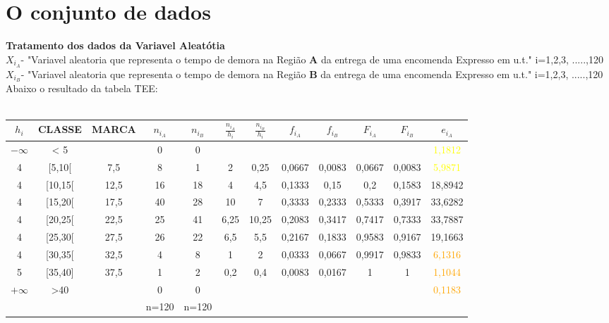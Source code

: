 \section{O conjunto de dados}\label{dados}
\noindent
\textbf{Tratamento dos dados da Variavel Aleatótia} \\
$X_{i_A}$- "Variavel aleatoria que representa o tempo de demora na Região \textbf{A} da entrega de uma encomenda Expresso em u.t." \quad i=1,2,3, .....,120 \\
$X_{i_B}$- "Variavel aleatoria que representa o tempo de demora na Região \textbf{B} da entrega de uma encomenda Expresso em u.t." \quad i=1,2,3, .....,120 \\
Abaixo o resultado da tabela TEE:\\
\\
\begin{minipage}{0pt}
\begin{tabular}{ |c|c|c|c|c|c|c|c|c|c|c|c| }
\hline
\rowcolor[gray]{0.7}
$h_i$ & CLASSE & MARCA & $n_{i_A}$ & $n_{i_B}$ & $\frac{n_{i_A}}{h_i}$ & $\frac{n_{i_B}}{h_i}$ & $f_{i_A}$	& $f_{i_B}$ & $F_{i_A}$ & $F_{i_B}$ & $e_{i_A}$ \\
\hline
$-\infty$ & < 5 & & 0 & 0 & & & & & & & \textcolor{yellow}{1,1812} \\
\hline
4 & [5,10[ & 7,5 & 8 & 1 & 2 & 0,25 & 0,0667 & 0,0083 & 0,0667 & 0,0083 & \textcolor{yellow}{5,9871}\\
\hline
4 & [10,15[ & 12,5 & 16 & 18 & 4 & 4,5 & 0,1333 & 0,15 & 0,2 & 0,1583 & 18,8942\\
\hline
4 & [15,20[ & 17,5 & 40 & 28 & 10 & 7 & 0,3333 & 0,2333 & 0,5333 & 0,3917 & 33,6282\\
\hline
4 & [20,25[ & 22,5 & 25 & 41 & 6,25 & 10,25 & 0,2083 & 0,3417 & 0,7417 & 0,7333 & 33,7887\\
\hline
4 & [25,30[ & 27,5 & 26 & 22 & 6,5 & 5,5 & 0,2167 & 0,1833 & 0,9583 & 0,9167 & 19,1663\\
\hline
4 & [30,35[ & 32,5 & 4 & 8 & 1 & 2 & 0,0333 & 0,0667 & 0,9917 & 0,9833 & \textcolor{orange}{6,1316}\\
\hline
5 & [35,40] & 37,5 & 1 & 2 & 0,2 & 0,4 & 0,0083 & 0,0167 & 1 & 1 & \textcolor{orange}{1,1044}\\
\hline
$+\infty$ & >40 & & 0 & 0 & & & & & & & \textcolor{orange}{0,1183}\\
\hline
& & & n=120 & n=120 & & & & & & & \\
\hline
\end{tabular}
\end{minipage}
